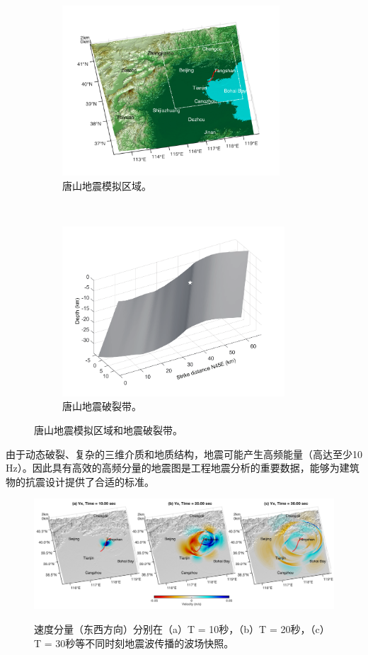 \documentclass[degree=doctor]{thuthesis}
\begin{document}
\begin{figure}[ht]
    \centering
    \begin{subfigure}[b]{0.5\textwidth}
        \centering
        \includegraphics[height=2.5in]{GeoMapTangshan.pdf}
        \caption{唐山地震模拟区域。}
    \end{subfigure}%
    ~
    \begin{subfigure}[b]{0.5\textwidth}
        \centering
        \includegraphics[height=2.5in]{fault.pdf}
        \caption{唐山地震破裂带。}
    \end{subfigure}
    \caption{唐山地震模拟区域和地震破裂带。}
    \label{fig:tangshan_region}
\end{figure}

由于动态破裂、复杂的三维介质和地质结构，地震可能产生高频能量（高达至少10 Hz）。因此具有高效的高频分量的地震图是工程地震分析的重要数据，能够为建筑物的抗震设计提供了合适的标准。

\begin{figure}[ht]
    \includegraphics[width=1.0\columnwidth]{Snap_Vx_tangshan.pdf}\\
    \caption{速度分量（东西方向）分别在（a）T = 10秒，（b）T = 20秒，（c）T = 30秒等不同时刻地震波传播的波场快照。}
    \label{fig:strong_motion_2}
\end{figure}
\end{document}
